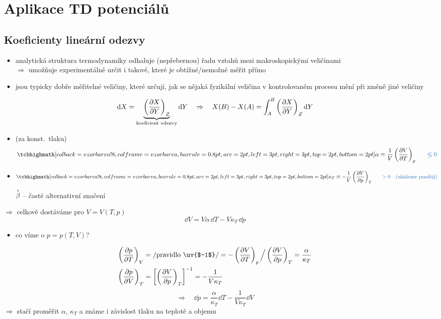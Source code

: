 \providecommand{\modre}[1]{\textcolor{NavyBlue}{#1}}
\providecommand{\cervene}[1]{\textcolor{Red}{#1}}
\providecommand{\dbar}{{\mathchar'26\mkern-12mu d}}

\section{Aplikace TD potenciálů}

\subsection{Koeficienty lineární odezvy}
\begin{itemize}
  \item[--] analytická struktura termodynamiky odhaluje (nepřebernou) řadu vztahů mezi makroskopickými veličinami \\
        $\Rightarrow$ umožňuje experimentálně určit i takové, které je obtížné/nemožné měřit přímo
  \item[--]  jsou typicky dobře měřitelné veličiny, které určují, jak se nějaká fyzikální veličina v kontrolovaném procesu mění při změně jiné veličiny
\end{itemize}
\[
  \dd X = \underbrace{\left(\pdv{X}{Y}\right)_Z}_{\text{koeficient odezvy}}\dd Y
  \quad\Rightarrow\quad X(B) - X(A) = \int_A^B\left(\pdv{X}{Y}\right)_Z\dd Y
\]

\begin{priklad}[Př:]
\begin{itemize}
  \item {} (za konst.\ tlaku)
  \[
    \vzorec{\alpha \equiv \frac1V\left(\pdv{V}{T}\right)_p} \qquad \modre{\lessgtr 0}
  \]
  \item {}
  \[
    \vzorec{\kappa_T \equiv -\frac1V\left(\pdv{V}{p}\right)_T} \qquad \modre{> 0 \quad \text{(ukážeme později)}}
  \]
  \modre{\phantom{xxxxxx}$\overset{\shortparallel}{\beta}$ -- časté alternativní značení}
\end{itemize}
\end{priklad}

$\Rightarrow$ celkově dostáváme pro $V = V(T,p)$
\[
  \dd V = V\alpha\,\dd T - V\kappa_T\,\dd p \tag{$*$}
\]

\begin{itemize}
  \item co víme o $p = p(T,V)$?
\end{itemize}
\begin{align*}
  \left(\pdv{p}{T}\right)_V &= /\text{pravidlo \uv{$-1$}}/ = -\left(\pdv{V}{T}\right)_p\Big/\left(\pdv{V}{p}\right)_T = \frac{\alpha}{\kappa_T} \\
  \left(\pdv{p}{V}\right)_T &= \left[\left(\pdv{V}{p}\right)_T\right]^{-1} = -\frac{1}{V\kappa_T}
\end{align*}
\[
  \Rightarrow\quad \dd p = \frac{\alpha}{\kappa_T}\dd T - \frac{1}{V\kappa_T}\dd V \tag{$**$}
\]
$\Rightarrow$ stačí proměřit $\alpha$, $\kappa_T$ a známe i závislost tlaku na teplotě a objemu

